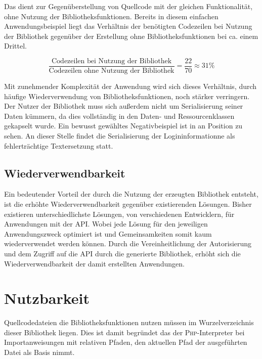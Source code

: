 Das  dient zur Gegenüberstellung von Quellcode mit der gleichen Funktionalität, ohne Nutzung der Bibliotheksfunktionen. Bereits in diesem einfachen Anwendungsbeispiel liegt das Verhältnis der benötigten Codezeilen bei Nutzung der Bibliothek gegenüber der Erstellung ohne Bibliotheksfunktionen bei ca. einem Drittel.

\[
  \frac{\text{Codezeilen bei Nutzung der Bibliothek}}{\text{Codezeilen ohne Nutzung der Bibliothek}} = \frac{22}{70} \approx 31\%
\]

Mit zunehmender Komplexität der Anwendung wird sich dieses Verhältnis, durch häufige Wiederverwendung von Bibliotheksfunktionen, noch stärker verringern. Der Nutzer der Bibliothek muss sich außerdem nicht um Serialisierung seiner Daten kümmern, da dies vollständig in den Daten- und Ressourcenklassen gekapselt wurde. Ein bewusst gewähltes Negativbeispiel ist in  an Position  zu sehen. An dieser Stelle findet die Serialisierung der Logininformationne als fehlerträchtige Textersetzung statt.

\newpage



\subsection{Wiederverwendbarkeit}
\label{sec:reusability}

Ein bedeutender Vorteil der durch die Nutzung der erzeugten Bibliothek entsteht, ist die erhöhte Wiederverwendbarkeit gegenüber existierenden Lösungen. Bisher existieren unterschiedlichste Lösungen, von verschiedenen Entwicklern, für Anwendungen mit der \gls{API}. Wobei jede Lösung für den jeweiligen Anwendungszweck optimiert ist und Gemeinsamkeiten somit kaum wiederverwendet werden können. Durch die Vereinheitlichung der Autorisierung und dem Zugriff auf die \gls{API} durch die generierte Bibliothek, erhöht sich die Wiederverwendbarkeit der damit erstellten Anwendungen.

\section{Nutzbarkeit}
\label{sec:usability}

Quellcodedateien die Bibliotheksfunktionen nutzen müssen im Wurzelverzeichnis dieser Bibliothek liegen. Dies ist damit begründet das der \textsc{Php}-Interpreter bei Importanweisungen mit relativen Pfaden, den aktuellen Pfad der ausgeführten Datei als Basis nimmt.

